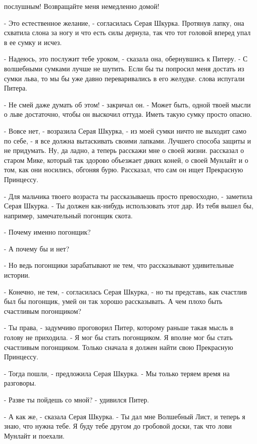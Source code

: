 послушным! Возвращайте меня немедленно домой!
\par- Это естественное желание, - согласилась Серая Шкурка. Протянув 
лапку, она схватила слона за ногу и что есть силы дернула, так что тот 
головой вперед упал в ее сумку и исчез.
\par- Надеюсь, это послужит тебе уроком, - сказала она, обернувшись к 
Питеру. - С волшебными сумками лучше не шутить. Если бы ты попросил 
меня достать из сумки льва, то мы бы уже давно переваривались в его 
желудке.
 слова испугали Питера.
\par- Не смей даже думать об этом! - закричал он. - Может быть, одной 
твоей мысли о льве достаточно, чтобы он выскочил оттуда. Иметь такую 
сумку просто опасно.
\par- Вовсе нет, - возразила Серая Шкурка, - из моей сумки ничто не 
выходит само по себе, - я все должна вытаскивать своими лапками. 
Лучшего способа защиты и не придумать. Ну, да ладно, а теперь расскажи 
мне о своей жизни.
 рассказал о старом Мике, который так здорово объезжает диких 
коней, о своей Мунлайт и о том, как они носились, обгоняя бурю. 
Рассказал, что сам он ищет Прекрасную Принцессу.
\par- Для мальчика твоего возраста ты рассказываешь просто 
превосходно, - заметила Серая Шкурка. - Ты должен как-нибудь 
использовать этот дар. Из тебя вышел бы, например, замечательный 
погонщик скота.
\par- Почему именно погонщик?
\par- А почему бы и нет?
\par- Но ведь погонщики зарабатывают не тем, что рассказывают 
удивительные истории.
\par- Конечно, не тем, - согласилась Серая Шкурка, - но ты представь, 
как счастлив был бы погонщик, умей он так хорошо рассказывать. А чем 
плохо быть счастливым погонщиком?
\par- Ты права, - задумчиво проговорил Питер, которому раньше такая 
мысль в голову не приходила. - Я мог бы стать погонщиком. Я вполне мог 
бы стать счастливым погонщиком. Только сначала я должен найти свою 
Прекрасную Принцессу.
\par- Тогда пошли, - предложила Серая Шкурка. - Мы только теряем время 
на разговоры.
\par- Разве ты пойдешь со мной? - удивился Питер.
\par- А как же, - сказала Серая Шкурка. - Ты дал мне Волшебный Лист, и 
теперь я знаю, что нужна тебе. Я буду тебе другом до гробовой доски, 
так что лови Мунлайт и поехали.
